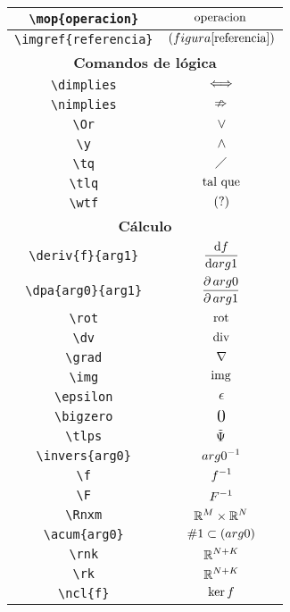 \begin{longtable}{|c|c|}
 \hline\verb|\mop{operacion}| & $\displaystyle\mathrm{operacion}\,$ \\ \hline 
\verb|\imgref{referencia}| & $\displaystyle\imgref{referencia}$ \\ \hline 
\multicolumn{2}{|c|}{\textbf{Comandos de lógica}} \\ \hline 
\verb|\dimplies| & $\displaystyle\iff$ \\ \hline 
\verb|\nimplies| & $\displaystyle\nRightarrow$ \\ \hline 
\verb|\Or| & $\displaystyle\vee$ \\ \hline 
\verb|\y| & $\displaystyle\wedge$ \\ \hline 
\verb|\tq| & $\displaystyle\;\diagup\;$ \\ \hline 
\verb|\tlq| & $\displaystyle\text{ tal que }$ \\ \hline 
\verb|\wtf| & $\displaystyle(?)$ \\ \hline 
\multicolumn{2}{|c|}{\textbf{Cálculo}} \\ \hline 
\verb|\deriv{f}{arg1}| & $\displaystyle\frac{\operatorname{d\!}{} f}{\operatorname{d\!}{} arg1}$ \\ \hline 
\verb|\dpa{arg0}{arg1}| & $\displaystyle\frac{\partial\,arg0}{\partial\, arg1}$ \\ \hline 
\verb|\rot| & $\displaystyle\operatorname{rot}$ \\ \hline 
\verb|\dv| & $\displaystyle\operatorname{div}$ \\ \hline 
\verb|\grad| & $\displaystyle\nabla$ \\ \hline 
\verb|\img| & $\displaystyle\operatorname{img}$ \\ \hline 
\verb|\epsilon| & $\displaystyle\epsilon$ \\ \hline 
\verb|\bigzero| & $\displaystyle\text{\Large 0}$ \\ \hline 
\verb|\tlps| & $\displaystyle\tilde{\Psi}$ \\ \hline 
\verb|\invers{arg0}| & $\displaystyle arg0 ^ {-1}$ \\ \hline 
\verb|\f| & $\displaystyle f ^ {-1}$ \\ \hline 
\verb|\F| & $\displaystyle F ^ {-1}$ \\ \hline 
\verb|\Rnxm| & $\displaystyle\mathbb{R}^M\times\mathbb{R}^N$ \\ \hline 
\verb|\acum{arg0}| & $\displaystyle\acum{arg0}$ \\ \hline 
\verb|\rnk| & $\displaystyle\mathbb{R}^{N+K}$ \\ \hline 
\verb|\rk| & $\displaystyle\mathbb{R}^{N+K}$ \\ \hline 
\verb|\ncl{f}| & $\displaystyle\ker f$ \\ \hline 

\end{longtable}
